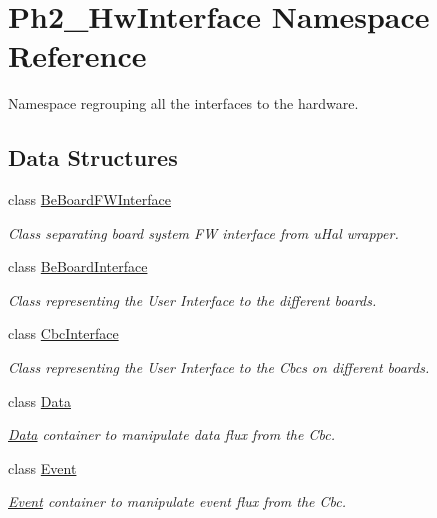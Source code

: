 \hypertarget{namespace_ph2___hw_interface}{\section{Ph2\-\_\-\-Hw\-Interface Namespace Reference}
\label{namespace_ph2___hw_interface}
}


Namespace regrouping all the interfaces to the hardware.  


\subsection*{Data Structures}
\begin{DoxyCompactItemize}
\item 
class \hyperlink{class_ph2___hw_interface_1_1_be_board_f_w_interface}{Be\-Board\-F\-W\-Interface}
\begin{DoxyCompactList}\small\item\em Class separating board system F\-W interface from u\-Hal wrapper. \end{DoxyCompactList}\item 
class \hyperlink{class_ph2___hw_interface_1_1_be_board_interface}{Be\-Board\-Interface}
\begin{DoxyCompactList}\small\item\em Class representing the User Interface to the different boards. \end{DoxyCompactList}\item 
class \hyperlink{class_ph2___hw_interface_1_1_cbc_interface}{Cbc\-Interface}
\begin{DoxyCompactList}\small\item\em Class representing the User Interface to the Cbcs on different boards. \end{DoxyCompactList}\item 
class \hyperlink{class_ph2___hw_interface_1_1_data}{Data}
\begin{DoxyCompactList}\small\item\em \hyperlink{class_ph2___hw_interface_1_1_data}{Data} container to manipulate data flux from the Cbc. \end{DoxyCompactList}\item 
class \hyperlink{class_ph2___hw_interface_1_1_event}{Event}
\begin{DoxyCompactList}\small\item\em \hyperlink{class_ph2___hw_interface_1_1_event}{Event} container to manipulate event flux from the Cbc. \end{DoxyCompactList}\item 

\end{DoxyCompactItemize}
